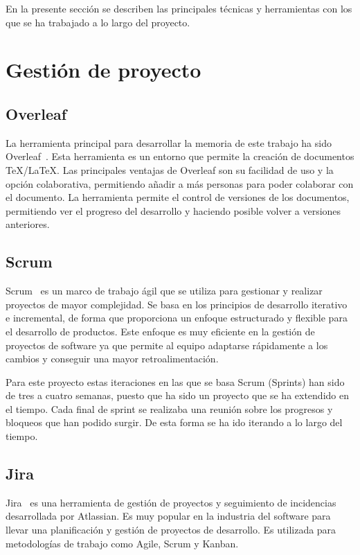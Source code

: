 
En la presente sección se describen las principales técnicas y herramientas con los que se ha trabajado a lo largo del proyecto.

\section{Gestión de proyecto}

\subsection{Overleaf}
La herramienta principal para desarrollar la memoria de este trabajo ha sido Overleaf~\cite{overleaf}. Esta herramienta es un entorno que permite la creación de documentos TeX/LaTeX.
Las principales ventajas de Overleaf son su facilidad de uso y la opción colaborativa, permitiendo añadir a más personas para poder colaborar con el documento.
La herramienta permite el control de versiones de los documentos, permitiendo ver el progreso del desarrollo y haciendo posible volver a versiones anteriores.


\subsection{Scrum}
Scrum~\cite{scrum} es un marco de trabajo ágil que se utiliza para gestionar y realizar proyectos de mayor complejidad.
Se basa en los principios de desarrollo iterativo e incremental, de forma que proporciona un enfoque estructurado y flexible para el desarrollo de productos. Este enfoque es muy eficiente en la gestión de proyectos de software ya que permite al equipo adaptarse rápidamente a los cambios y conseguir una mayor retroalimentación.

Para este proyecto estas iteraciones en las que se basa Scrum (Sprints) han sido de tres a cuatro semanas, puesto que ha sido un proyecto que se ha extendido en el tiempo. Cada final de sprint se realizaba una reunión sobre los progresos y bloqueos que han podido surgir. De esta forma se ha ido iterando a lo largo del tiempo.

\subsection{Jira}
Jira~\cite{jira} es una herramienta de gestión de proyectos y seguimiento de incidencias desarrollada por Atlassian. Es muy popular en la industria del software para llevar una planificación y gestión de proyectos de desarrollo. Es utilizada para metodologías de trabajo como Agile, Scrum y Kanban. 

